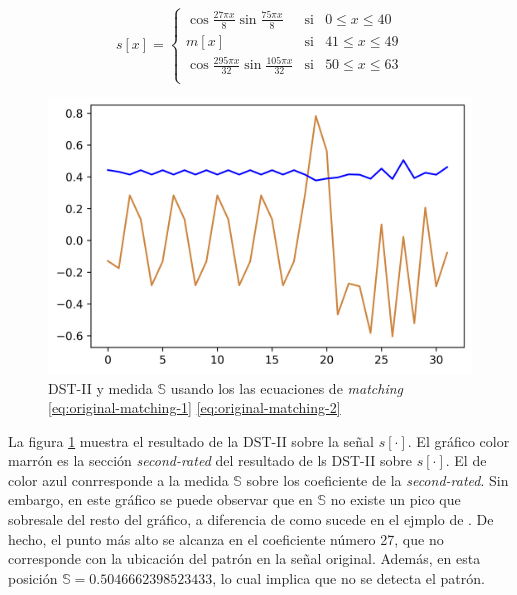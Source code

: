 \begin{equation}
	s[x] = \left\{ \begin{array}{rcl}
			\cos{\frac{27\pi x}{8}}\sin{\frac{75\pi x}{8}} & \mbox{si} &  0\leq x \leq 40 \\
			m[x]    &    \mbox{si}     &     41\leq x \leq 49     \\
			\cos{\frac{295\pi x}{32}}\sin{\frac{105\pi x}{32}} & \mbox{si} &  50\leq x \leq 63 \\
					 \end{array}
	\right.
\end{equation}

\begin{figure}
	\centering
	\includegraphics[scale=0.8]{Graphics/example-guido-signal-dst-s-wrong-matching.png}
	\caption{DST-II y medida $\mathbb{S}$ usando los las ecuaciones de \textit{matching} \ref{eq:original-matching-1} \ref{eq:original-matching-2}} \label{fig:example-guido-signal-dst-s-wrong-matching}
\end{figure}


La figura \ref{fig:example-guido-signal-dst-s-wrong-matching} muestra el resultado de la DST-II sobre la señal $s[\cdot]$.
El gráfico color marrón es la sección \textit{second-rated} del resultado de ls DST-II sobre $s[\cdot]$.
El de color azul conrresponde a la medida $\mathbb{S}$ sobre los coeficiente de la \textit{second-rated}. 
Sin embargo, en este gráfico se puede observar que en $\mathbb{S}$ no existe un pico que sobresale del resto del
gráfico, a diferencia de como sucede en el ejmplo de \cite{Guido2018}. De hecho, el punto más alto
se alcanza en el coeficiente número 27, que no corresponde con la ubicación del patrón en la señal 
original. Además, en esta posición $\mathbb{S}=0.5046662398523433$, lo cual implica que no se detecta el patrón.

